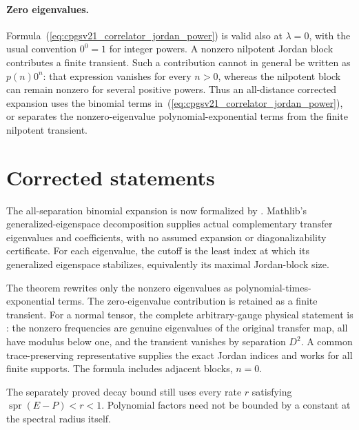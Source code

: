 \documentclass{article}
\begin{document}
\paragraph{Zero eigenvalues.}
Formula~(\ref{eq:cpgsv21_correlator_jordan_power}) is valid also at
$\lambda=0$, with the usual convention $0^0=1$ for integer powers.
A nonzero nilpotent Jordan block contributes a finite transient. Such a
contribution cannot in general be written as $p(n)0^n$: that expression
vanishes for every $n>0$, whereas the nilpotent block can remain nonzero
for several positive powers. Thus an all-distance corrected expansion
uses the binomial terms in~(\ref{eq:cpgsv21_correlator_jordan_power}), or
separates the nonzero-eigenvalue polynomial-exponential terms from the
finite nilpotent transient.

\section{Corrected statements}

The all-separation binomial expansion is now formalized by
.
Mathlib's generalized-eigenspace decomposition supplies actual complementary
transfer eigenvalues and coefficients, with no assumed expansion or
diagonalizability certificate. For each eigenvalue, the cutoff is the least
index at which its generalized eigenspace stabilizes, equivalently its
maximal Jordan-block size.

The theorem
rewrites only the nonzero eigenvalues as polynomial-times-exponential terms.
The zero-eigenvalue contribution is retained as a finite transient.
For a normal tensor, the complete arbitrary-gauge physical statement is
:
the nonzero frequencies are genuine eigenvalues of the original transfer
map, all have modulus below one, and the transient vanishes by separation
$D^2$. A common trace-preserving representative supplies the exact Jordan
indices and works for all finite supports. The formula includes adjacent
blocks, $n=0$.

The separately proved decay bound still uses every rate $r$ satisfying
$\operatorname{spr}(E-P)<r<1$. Polynomial factors need not be bounded by a
constant at the spectral radius itself.
\end{document}
